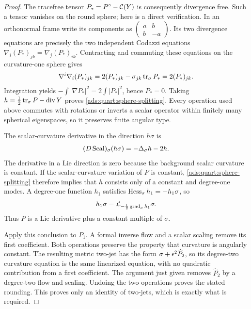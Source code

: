 \begin{proof}
The tracefree tensor \(P_*=P^{\circ}-\mathcal C(Y)\) is consequently
divergence free.  Such a tensor vanishes on the round sphere; here is
a direct verification.  In an orthonormal frame write its components
as
\(\left(\begin{smallmatrix}a&b\\b&-a\end{smallmatrix}\right)\).
Its two divergence equations are precisely the two independent
Codazzi equations
\(\nabla_i(P_*)_{jk}=\nabla_j(P_*)_{ik}\).
Contracting and commuting these equations on the curvature-one sphere
gives
\[
 \nabla^i\nabla_i(P_*)_{jk}
      =2(P_*)_{jk}-\sigma_{jk}\operatorname{tr}_\sigma P_*
      =2(P_*)_{jk}.
\]
Integration yields
\(-\int|\nabla P_*|^2=2\int|P_*|^2\), hence \(P_*=0\).
Taking
\(h=\frac12\operatorname{tr}_\sigma P-\operatorname{div} Y\) proves
\eqref{ads:quart:sphere-splitting}.  Every operation used above commutes
with rotations or inverts a scalar operator within finitely many
spherical eigenspaces, so it preserves finite angular type.

The scalar-curvature derivative in the direction \(h\sigma\) is
\[
 (D\operatorname{Scal})_\sigma(h\sigma)=-\Delta_\sigma h-2h.
\]
The derivative in a Lie direction is zero because the background
scalar curvature is constant.  If the scalar-curvature variation of
\(P\) is constant, \eqref{ads:quart:sphere-splitting} therefore implies
that \(h\) consists only of a constant and degree-one modes.  A
degree-one function \(h_1\) satisfies
\(\operatorname{Hess}_\sigma h_1=-h_1\sigma\), so
\[
 h_1\sigma
   =\mathcal L_{-\frac12\operatorname{grad}_\sigma h_1}\sigma.
\]
Thus \(P\) is a Lie derivative plus a constant multiple of \(\sigma\).

Apply this conclusion to \(P_1\).  A formal inverse flow and a scalar
scaling remove its first coefficient.  Both operations preserve
the property that curvature is angularly constant.  The resulting
metric two-jet has the form \(\sigma+\epsilon^2\widehat P_2\), so its
degree-two curvature equation is the same linearized equation, with
no quadratic contribution from a first coefficient.  The argument
just given removes \(\widehat P_2\) by a degree-two flow and scaling.
Undoing the two operations proves the stated rounding.  This proves
only an identity of two-jets, which is exactly what is required.
\end{proof}

